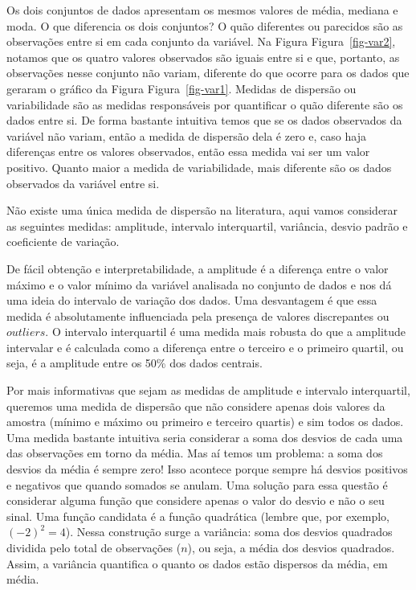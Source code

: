\documentclass[
  letterpaper,
  DIV=11,
  numbers=noendperiod]{scrreprt}
\begin{document}
Os dois conjuntos de dados apresentam os mesmos valores de média,
mediana e moda. O que diferencia os dois conjuntos? O quão diferentes ou
parecidos são as observações entre si em cada conjunto da variável. Na
Figura Figura~\ref{fig-var2}, notamos que os quatro valores observados
são iguais entre si e que, portanto, as observações nesse conjunto não
variam, diferente do que ocorre para os dados que geraram o gráfico da
Figura Figura~\ref{fig-var1}. Medidas de dispersão ou variabilidade são
as medidas responsáveis por quantificar o quão diferente são os dados
entre si. De forma bastante intuitiva temos que se os dados observados
da variável não variam, então a medida de dispersão dela é zero e, caso
haja diferenças entre os valores observados, então essa medida vai ser
um valor positivo. Quanto maior a medida de variabilidade, mais
diferente são os dados observados da variável entre si.

Não existe uma única medida de dispersão na literatura, aqui vamos
considerar as seguintes medidas: amplitude, intervalo interquartil,
variância, desvio padrão e coeficiente de variação.

De fácil obtenção e interpretabilidade, a amplitude é a diferença entre
o valor máximo e o valor mínimo da variável analisada no conjunto de
dados e nos dá uma ideia do intervalo de variação dos dados. Uma
desvantagem é que essa medida é absolutamente influenciada pela presença
de valores discrepantes ou \(outliers\). O intervalo interquartil é uma
medida mais robusta do que a amplitude intervalar e é calculada como a
diferença entre o terceiro e o primeiro quartil, ou seja, é a amplitude
entre os 50\% dos dados centrais.

Por mais informativas que sejam as medidas de amplitude e intervalo
interquartil, queremos uma medida de dispersão que não considere apenas
dois valores da amostra (mínimo e máximo ou primeiro e terceiro quartis)
e sim todos os dados. Uma medida bastante intuitiva seria considerar a
soma dos desvios de cada uma das observações em torno da média. Mas aí
temos um problema: a soma dos desvios da média é sempre zero! Isso
acontece porque sempre há desvios positivos e negativos que quando
somados se anulam. Uma solução para essa questão é considerar alguma
função que considere apenas o valor do desvio e não o seu sinal. Uma
função candidata é a função quadrática (lembre que, por exemplo,
\((−2)^2=4\)). Nessa construção surge a variância: soma dos desvios
quadrados dividida pelo total de observações (\(n\)), ou seja, a média
dos desvios quadrados. Assim, a variância quantifica o quanto os dados
estão dispersos da média, em média.
\end{document}
